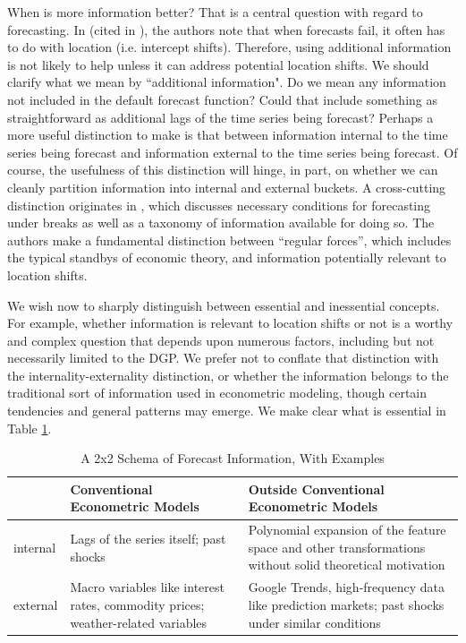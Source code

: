 \documentclass{uiucthesis2021}
\theoremstyle{definition}
\begin{document}
  When is more information better?  That is a central question with regard to forecasting.   In \cite[][]{clements2005guest} (cited in \cite[][]{castle2013forecasting}), the authors note that when forecasts fail, it often has to do with location (i.e. intercept shifts).  Therefore, using additional information is not likely to help unless it can address potential location shifts.  We should clarify what we mean by ``additional information".  Do we mean any information not included in the default forecast function?  Could that include something as straightforward as additional lags of the time series being forecast?  Perhaps a more useful distinction to make is that between information internal to the time series being forecast and information external to the time series being forecast.  Of course, the usefulness of this distinction will hinge, in part, on whether we can cleanly partition information into internal and external buckets.  A cross-cutting distinction originates in \cite[][]{castle2011forecasting}, which discusses necessary conditions for forecasting under breaks as well as a taxonomy of information available for doing so.  The authors make a fundamental distinction between ``regular forces'', which includes the typical standbys of economic theory, and information potentially relevant to location shifts.  
  
  We wish now to sharply distinguish between essential and inessential concepts.  For example, whether information is relevant to location shifts or not is a worthy and complex question that depends upon numerous factors, including but not necessarily limited to the DGP.  We prefer not to conflate that distinction with the internality-externality distinction, or whether the information belongs to the traditional sort of information used in econometric modeling, though certain tendencies and general patterns may emerge.  We make clear what is essential in Table \ref{tab:information_table}.
  
  \begin{table}[htb]
    \centering %
    \caption{A 2x2 Schema of Forecast Information, With Examples}\label{tab:information_table}
    \begin{tabular}{ | m{3em} | m{6cm}| m{8cm} | } 
      \hline
      & Conventional Econometric Models & Outside Conventional Econometric Models\\ 
      \hline
      internal & Lags of the series itself; past shocks & Polynomial expansion of the feature space and other transformations without solid theoretical motivation \\
      \hline
      external & Macro variables like interest rates, commodity prices; weather-related variables & Google Trends, high-frequency data like prediction markets; past shocks under similar conditions \\ 
      \hline
    \end{tabular}
  \end{table}
   
\end{document}
